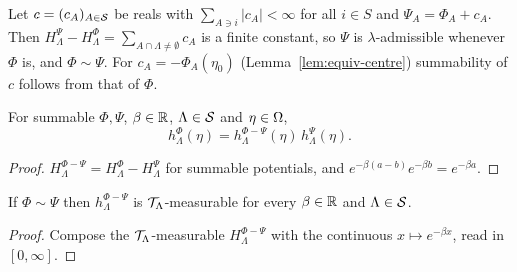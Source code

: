 \begin{remark}
    \label{rmk:equiv-add-constants}

    Let $c = (c_A)_{A \in \mathcal{S}}$ be reals with $\sum_{A \ni i} |c_A| < \infty$ for all $i \in S$
    and $\Psi_A = \Phi_A + c_A$. Then $H_\Lambda^{\Psi} - H_\Lambda^{\Phi} =
    \sum_{A \cap \Lambda \neq \emptyset} c_A$ is a finite constant, so $\Psi$ is
    $\lambda$-admissible whenever $\Phi$ is, and $\Phi \sim \Psi$. For $c_A = -\Phi_A(\eta_0)$
    (Lemma~\ref{lem:equiv-centre}) summability of $c$ follows from that of $\Phi$.
\end{remark}

\begin{lemma}
    \label{lem:equiv-boltzmann-mul}
    \leanok

    For summable $\Phi, \Psi$, $\beta \in \mathbb{R}$, $\Lambda \in \mathcal{S}$ and $\eta \in \Omega$,
    \[ h_\Lambda^{\Phi}(\eta) = h_\Lambda^{\Phi - \Psi}(\eta) \, h_\Lambda^{\Psi}(\eta). \]
\end{lemma}
\begin{proof}
    \leanok

    $H_\Lambda^{\Phi - \Psi} = H_\Lambda^\Phi - H_\Lambda^\Psi$ for summable potentials, and
    $e^{-\beta(a-b)}e^{-\beta b} = e^{-\beta a}$.
\end{proof}

\begin{lemma}
    \label{lem:equiv-boltzmann-measurable}
    \leanok

    If $\Phi \sim \Psi$ then $h_\Lambda^{\Phi - \Psi}$ is $\mathcal{T}_\Lambda$-measurable for every
    $\beta \in \mathbb{R}$ and $\Lambda \in \mathcal{S}$.
\end{lemma}
\begin{proof}
    \leanok

    Compose the $\mathcal{T}_\Lambda$-measurable $H_\Lambda^{\Phi-\Psi}$ with the continuous
    $x \mapsto e^{-\beta x}$, read in $[0,\infty]$.
\end{proof}

